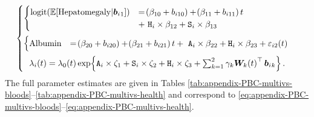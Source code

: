\begin{equation}
    \begin{aligned}
    \begin{cases}
        \begin{cases}
           \mathrm{logit}\lb\Exp\ls\mathrm{Hepatomegaly}|\b{_1}\rs\rb&=\lb\beta_{10}+b_{i10}\rb + \lb\beta_{11} + b_{i11}\rb t\\& +\ \tt{H}_i\times\beta_{12} + \tt{S}_i\times\beta_{13}
        \end{cases}
        \\\noalign{\vspace*{2mm}}
        \begin{cases}
            \mathrm{Albumin} &= \lb\beta_{20} + b_{i20}\rb + \lb\beta_{21} + b_{i21}\rb t +\ \tt{A}_i\times\beta_{22} + \tt{H}_i\times\beta_{23} + \varepsilon_{i2}\lb t\rb
        \end{cases}
        \\\noalign{\vspace*{2mm}}
        \ \ \li\lb t\rb = \lo\lb t\rb \exp\lbr\tt{A}_i\times\zeta_1+\tt{S}_i\times\zeta_2+\tt{H}_i\times\zeta_3+\sum_{k=1}^2\gamma_k\bm{W}_k\lb t\rb^\top\b{_k}\rbr.
    \end{cases}       
    \end{aligned}
\label{eq:appendix-PBC-multivs-health}
\end{equation}
The full parameter estimates are given in Tables \ref{tab:appendix-PBC-multivs-bloods}--\ref{tab:appendix-PBC-multivs-health} and correspond to \eqref{eq:appendix-PBC-multivs-bloods}--\eqref{eq:appendix-PBC-multivs-health}.
